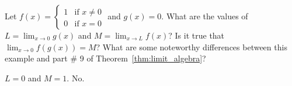 \begin{enumialphparenastyle}
\begin{ex}
Let $f(x)=\left\{ 
\begin{array}{cc}
1 & \text{if }x\neq 0 \\ 
0 & \text{if }x=0%
\end{array}%
\right.$ and $g(x)=0$. What are the values of $
L=\lim_{x\to 0}g(x)$ and $M=\lim_{x\to L}f(x)$? Is it true that $\lim_{x\to	0}f(g(x))=M$? What are some noteworthy differences
between this example and part \# 9 of Theorem~\ref{thm:limit_algebra}?
\begin{sol}
	$L=0$ and $M=1.$ No.
\end{sol}
\end{ex}

\end{enumialphparenastyle}

\clearpage
